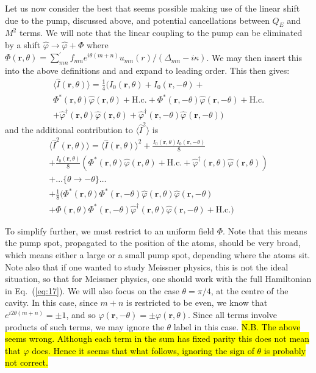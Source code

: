 \documentclass[twocolumn]{revtex4-1}
\renewcommand{\vec}[1]{\mathbf{#1}}
\begin{document}
Let us now consider the best that seems possible making use of the
linear shift due to the pump, discussed above, and potential
cancellations between $Q_E$ and $M^2$ terms.  We will note that the
linear coupling to the pump can be eliminated by a shift
$\hat{\varphi} \to \hat{\varphi} + \Phi$ where $\Phi(\vec{r},\theta) =
\sum^\prime_{mn} {f}_{mn} e^{i \theta(m+n)} u_{mn}(r) / (\Delta_{mn} -
i \kappa)$.  We may then insert this into the above definitions and
and expand to leading order.  This then gives:
\begin{multline}
  \langle \hat{I}(\vec{r},\theta) \rangle 
  =
  \frac{1}{4}\biggl(
  I_0(\vec{r},\theta) + I_0(\vec{r},-\theta)
  +
  \\  
    \Phi^\ast(\vec{r},\theta) \hat{\varphi}(\vec{r},\theta)
    +\text{H.c.}
    +
    \Phi^\ast(\vec{r},-\theta) \hat{\varphi}(\vec{r},-\theta)
    +\text{H.c.}
  \\ 
  +
  \hat{\varphi}^\dagger(\vec{r},\theta) \hat{\varphi}^{}(\vec{r},\theta)
  +
  \hat{\varphi}^\dagger(\vec{r},-\theta) \hat{\varphi}^{}(\vec{r},-\theta)
  \biggr)
\end{multline}
and the additional contribution to $\langle \hat{I}^2 \rangle$ is
\begin{multline}
  \langle \hat{I}^2(\vec{r},\theta) \rangle
  = 
  \langle \hat{I}(\vec{r},\theta) \rangle^2
  + \frac{I_0(\vec{r},\theta)I_0(\vec{r},-\theta)}{8}
  \\
  + \frac{I_0(\vec{r},\theta)}{8} \left(
    \Phi^\ast(\vec{r},\theta) \hat{\varphi}(\vec{r},\theta)
    +\text{H.c.}
    +\hat{\varphi}^\dagger(\vec{r},\theta) \hat{\varphi}^{}(\vec{r},\theta)
  \right)
  \\
  +  \ldots \{\theta \to -\theta\} \ldots
  \\
  +
  \frac{1}{8} \biggl(
    \Phi^\ast(\vec{r},\theta) \Phi^\ast(\vec{r},-\theta)
    \hat{\varphi}(\vec{r},\theta)\hat{\varphi}(\vec{r},-\theta)
    \\+
    \Phi(\vec{r},\theta) \Phi^\ast(\vec{r},-\theta)
    \hat{\varphi}^\dagger(\vec{r},\theta)\hat{\varphi}(\vec{r},-\theta)
    + \text{H.c.} \biggr)
\end{multline}

To simplify further, we must restrict to an uniform field $\Phi$.
Note that this means the pump spot, propagated to the position of the
atoms, should be very broad, which means either a large or a small
pump spot, depending where the atoms sit.  Note also that if one
wanted to study Meissner physics, this is not the ideal situation, so
that for Meissner physics, one should work with the full Hamiltonian
in Eq.~(\ref{eq:17}).  We will also focus on the case $\theta=\pi/4$,
at the centre of the cavity.  In this case, since $m+n$ is restricted
to be even, we know that $e^{i2 \theta (m+n)}=\pm1$, and so
$\varphi(\vec{r},-\theta)= \pm \varphi(\vec{r},\theta)$.  Since all
terms involve products of such terms, we may ignore the $\theta$ 
label in this case.
\hl{N.B. The above seems wrong. Although each term in the sum
has fixed parity this does not mean that $\varphi$ does. Hence
it seems that what follows, ignoring the sign of $\theta$ is
probably not correct.}
\end{document}
